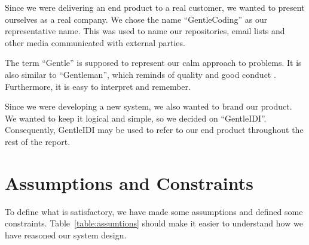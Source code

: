 Since we were delivering an end product to a real customer, we wanted to
present ourselves as a real company. We chose the name
``GentleCoding'' as our
representative name. This was used to name our repositories, email
lists and other media communicated with external parties.

The term ``Gentle'' is supposed to
represent our calm approach to problems. It is also similar to
``Gentleman'', which reminds of
quality and good conduct . Furthermore, it is easy to interpret and
remember.

Since we were developing a new system, we also wanted to brand our
product. We wanted to keep it logical and simple, so we decided on
``GentleIDI''. Consequently,
GentleIDI may be used to refer to our end product throughout the rest of the report.


\section{Assumptions and Constraints}
\label{sec:assumtions}


To define what is satisfactory, we have made some assumptions and
defined some constraints. Table~\ref{table:assumtions} should make it easier to understand
how we have reasoned our system design. 

